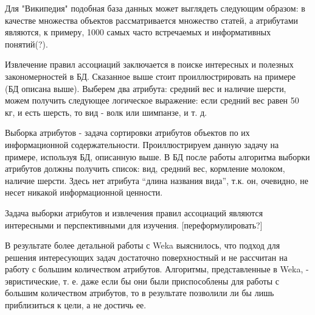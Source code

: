 Для "Википедия" подобная база данных может выглядеть следующим образом: в качестве множества
объектов рассматривается множество статей, а атрибутами являются, к примеру, 1000 самых часто
встречаемых и информативных понятий(?). 

Извлечение правил ассоциаций заключается в поиске интересных и полезных закономерностей в БД.
Сказанное выше стоит проиллюстрировать на примере (БД описана выше). Выберем два атрибута: средний 
вес и наличие шерсти, можем получить следующее логическое выражение: если средний вес равен 
50 кг, и есть шерсть, то вид - волк или шимпанзе, и т. д.

Выборка атрибутов - задача сортировки атрибутов объектов по их информационной содержательности.
Проиллюстрируем данную задачу на примере, используя БД, описанную выше. В БД после работы 
алгоритма выборки атрибутов должны получить список: вид, средний вес, кормление молоком, 
наличие шерсти. Здесь нет атрибута “длина названия вида”, т.к. он, очевидно, не несет
никакой информационной ценности.

Задача выборки атрибутов и извлечения правил ассоциаций являются интересными и перспективными
для изучения. [переформулировать?]

В результате более детальной работы с Weka выяснилось, что подход для решения интересующих задач
достаточно поверхностный и не рассчитан на работу с большим количеством атрибутов. Алгоритмы, 
представленные в Weka, - эвристические, т. е. даже если бы они были приспособлены для работы с 
большим количеством атрибутов, то в результате позволили ли бы лишь приблизиться к цели, а не
достичь ее.
